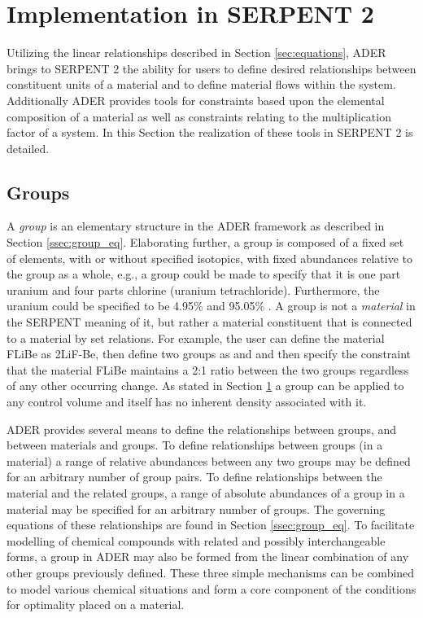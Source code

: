 \section{Implementation in SERPENT 2} \label{sec:implementation}
Utilizing the linear relationships described in 
Section \ref{sec:equations}, ADER brings to SERPENT 2 the ability for
users to define desired relationships between constituent units of a material 
and to define material flows within
the system. Additionally ADER provides tools for constraints based upon the 
elemental composition of a material
as well as constraints relating to the multiplication factor of a system. 
In this Section the realization of these tools in SERPENT 2 is detailed.



\subsection{Groups} \label{ssec:groups}
A \textit{group} is an elementary structure in the ADER framework as described 
in Section \ref{ssec:group_eq}.
Elaborating further, a group is composed of a fixed set of elements, with or 
without specified isotopics, with fixed abundances relative to the group as a 
whole, e.g.,  a group could be made to specify that it is one part uranium and 
four parts chlorine (uranium tetrachloride). Furthermore, the uranium could be 
specified to be 4.95\%  and 95.05\% . 
A group is not a \textit{material} in the SERPENT meaning of it, but rather a 
material constituent that is connected to a material by set relations. 
For example, the user can define the material FLiBe as 2LiF-Be, 
then define two groups as  and  and then specify the 
constraint that the material FLiBe maintains a  2:1 ratio between the two 
groups regardless of any other occurring change. As stated in Section 
\ref{sec:implementation} a group can be applied to any control volume and 
itself has no inherent density associated with it.

ADER provides several means to define the relationships between groups, and 
between  materials and groups. To define relationships between groups (in a
material) a range of relative abundances between any two groups
may be defined for an arbitrary number of group pairs. To define relationships
between the material and the related groups, a range of absolute abundances of 
a group in a material may be specified for an arbitrary number of groups. 
The governing equations of these relationships are found in 
Section \ref{ssec:group_eq}. To facilitate modelling
of chemical compounds with related and possibly interchangeable forms, a group
in ADER may also be formed from the linear combination of any other groups
previously defined. These three simple mechanisms can be combined to model
various chemical situations and form a core component of the conditions for
optimality placed on a material. 

